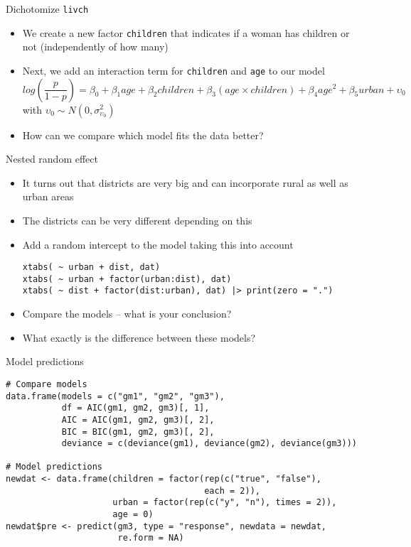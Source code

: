 \documentclass[aspectratio=169]{beamer}
\begin{document}
\begin{frame}{Dichotomize \texttt{livch}}
  \begin{itemize}
    \item We create a new factor \texttt{children} that indicates if a woman has
      children or not (independently of how many)
    \item Next, we add an interaction term for \texttt{children} and
      \texttt{age} to our model
      \[
        log(\frac{p}{1-p}) = \beta_0 + \beta_1 age + \beta_2 children + \beta_3
        (age \times children) + \beta_4 age^2 + \beta_5 urban + \upsilon_0
      \]
      with $\upsilon_0 \sim N(0, \sigma_{\upsilon_0}^2)$
    \item How can we compare which model fits the data better?
  \end{itemize}
\end{frame}

\begin{frame}[fragile]{Nested random effect}
  \begin{itemize}
    \item It turns out that districts are very big and can incorporate rural as
      well as urban areas
    \item The districts can be very different depending on this
    \item Add a random intercept to the model taking this into account
\begin{lstlisting}
xtabs( ~ urban + dist, dat)
xtabs( ~ urban + factor(urban:dist), dat)
xtabs( ~ dist + factor(dist:urban), dat) |> print(zero = ".")
\end{lstlisting}
    \item Compare the models -- what is your conclusion?
    \item What exactly is the difference between these models?
  \end{itemize}
\end{frame}

\begin{frame}[fragile]{Model predictions}
\begin{lstlisting}
# Compare models
data.frame(models = c("gm1", "gm2", "gm3"),
           df = AIC(gm1, gm2, gm3)[, 1],
           AIC = AIC(gm1, gm2, gm3)[, 2],
           BIC = BIC(gm1, gm2, gm3)[, 2],
           deviance = c(deviance(gm1), deviance(gm2), deviance(gm3)))

# Model predictions
newdat <- data.frame(children = factor(rep(c("true", "false"),
                                       each = 2)),
                     urban = factor(rep(c("y", "n"), times = 2)),
                     age = 0)
newdat$pre <- predict(gm3, type = "response", newdata = newdat,
                      re.form = NA)
\end{lstlisting}
\end{frame}
\end{document}
